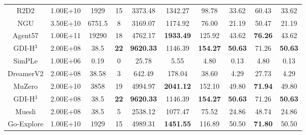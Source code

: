 \documentclass[nohyperref]{article}
\def\GDIHmeanhns{9620.33}
\def\GDIHmedianhns{1146.39}
\def\GDIHHWRB{22}
\def\GDIHmeanHWRNS{154.27}
\def\GDIHmedianHWRNS{50.63}
\def\GDIHmeanSABER{71.26}
\def\GDIHmedianSABER{50.63}
\def\GDIHnumframes{2.00E+08}
\def\GDIHgametime{38.5}
\def\rtdtmeanhns{3373.48}
\def\rtdtmedianhns{1342.27}
\def\rtdtHWRB{15}
\def\rtdtmeanHWRNS{98.78}
\def\rtdtmedianHWRNS{33.62}
\def\rtdtmeanSABER{60.43}
\def\rtdtmedianSABER{33.62}
\def\rtdtnumframes{1.00E+10}
\def\rtdtgametime{1929}
\def\ngumeanhns{3169.07}
\def\ngumedianhns{1174.92}
\def\nguHWRB{8}
\def\ngumeanHWRNS{76.00}
\def\ngumedianHWRNS{21.19}
\def\ngumeanSABER{50.47}
\def\ngumedianSABER{21.19}
\def\ngunumframes{3.50E+10}
\def\ngugametime{6751.5}
\def\agentmeanhns{4762.17}
\def\agentmedianhns{1933.49}
\def\agentHWRB{18}
\def\agentmeanHWRNS{125.92}
\def\agentmedianHWRNS{43.62}
\def\agentmeanSABER{76.26}
\def\agentmedianSABER{43.62}
\def\agentnumframes{1.00E+11}
\def\agentgametime{19290}
\def\muzeromeanhns{4994.97}
\def\muzeromedianhns{2041.12}
\def\muzeroHWRB{19}
\def\muzeromeanHWRNS{152.10}
\def\muzeromedianHWRNS{49.80}
\def\muzeromeanSABER{71.94}
\def\muzeromedianSABER{49.80}
\def\muzeronumframes{2.00E+10}
\def\muzerogametime{3858}
\def\dreamermeanhns{642.49}
\def\dreamermedianhns{178.04}
\def\dreamerHWRB{3}
\def\dreamermeanHWRNS{38.60}
\def\dreamermedianHWRNS{4.29}
\def\dreamermeanSABER{27.73}
\def\dreamermedianSABER{4.29}
\def\dreamernumframes{2.00E+08}
\def\dreamergametime{38.58 }
\def\simplemeanhns{25.78}
\def\simplemedianhns{5.55}
\def\simpleHWRB{0}
\def\simplemeanHWRNS{4.80}
\def\simplemedianHWRNS{0.13}
\def\simplemeanSABER{4.80}
\def\simplemedianSABER{0.13}
\def\simplenumframes{1.00E+06}
\def\simplegametime{0.19}
\def\mueslimeanhns{2538.12}
\def\mueslimedianhns{1077.47}
\def\muesliHWRB{5}
\def\mueslimeanHWRNS{75.52}
\def\mueslimedianHWRNS{24.86}
\def\mueslimeanSABER{48.74}
\def\mueslimedianSABER{24.86}
\def\mueslinumframes{2.00E+08}
\def\muesligametime{38.5}
\def\goexploremeanhns{4989.31}
\def\goexploremedianhns{1451.55}
\def\goexploreHWRB{15}
\def\goexploremeanHWRNS{116.89}
\def\goexploremedianHWRNS{50.50}
\def\goexploremeanSABER{71.80}
\def\goexploremedianSABER{50.50}
\def\goexplorenumframes{1.00E+10}
\def\goexploregametime{1929}
\theoremstyle{plain}
\begin{document}
\begin{table}[H]
\begin{tabular}{ |c | c | c | c| c c | c c |c c|}
R2D2        &\rtdtnumframes   &\rtdtgametime     & \rtdtHWRB & \rtdtmeanhns & \rtdtmedianhns &\rtdtmeanHWRNS  & \rtdtmedianHWRNS& \rtdtmeanSABER & \rtdtmedianSABER \\
NGU         &\ngunumframes & \ngugametime    & \nguHWRB  & \ngumeanhns & \ngumedianhns    &\ngumeanHWRNS  & \ngumedianHWRNS& \ngumeanSABER & \ngumedianSABER\\
Agent57     &\agentnumframes   & \agentgametime      & \agentHWRB & \agentmeanhns & \textbf{\agentmedianhns}    &\agentmeanHWRNS & \agentmedianHWRNS& \textbf{\agentmeanSABER} & \agentmedianSABER\\
\hline
\hline
GDI-H$^3$   &\GDIHnumframes    & \GDIHgametime      & \textbf{\GDIHHWRB} & \textbf{\GDIHmeanhns} & \GDIHmedianhns     &\textbf{\GDIHmeanHWRNS} &\textbf{\GDIHmedianHWRNS} & \GDIHmeanSABER & \textbf{\GDIHmedianSABER}\\
SimPLe      &\simplenumframes   & \simplegametime  & \simpleHWRB  & \simplemeanhns   & \simplemedianhns       &\simplemeanHWRNS   & \simplemedianHWRNS & \simplemeanSABER  & \simplemedianSABER\\
DreamerV2   &\dreamernumframes    & \dreamergametime     & \dreamerHWRB  & \dreamermeanhns  & \dreamermedianhns     &\dreamermeanHWRNS  & \dreamermedianHWRNS & \dreamermeanSABER & \dreamermedianSABER \\
MuZero      & \muzeronumframes   & \muzerogametime     & \muzeroHWRB & \muzeromeanhns & \textbf{\muzeromedianhns}    &\muzeromeanHWRNS & \muzeromedianHWRNS& \textbf{\muzeromeanSABER} & \muzeromedianSABER \\
\hline
\hline
GDI-H$^3$    &\GDIHnumframes    & \GDIHgametime       & \textbf{\GDIHHWRB} & \textbf{\GDIHmeanhns} & \GDIHmedianhns     &\textbf{\GDIHmeanHWRNS} &\textbf{\GDIHmedianHWRNS} & \GDIHmeanSABER & \textbf{\GDIHmedianSABER}\\
Muesli      &\mueslinumframes    & \muesligametime     & \muesliHWRB           &  \mueslimeanhns         & \mueslimedianhns    & \mueslimeanHWRNS          & \mueslimedianHWRNS  & \mueslimeanSABER & \mueslimedianSABER \\
Go-Explore  & \goexplorenumframes   & \goexploregametime     & \goexploreHWRB & \goexploremeanhns & \textbf{\goexploremedianhns}    &\goexploremeanHWRNS & \goexploremedianHWRNS& \textbf{\goexploremeanSABER} & \goexploremedianSABER\\
\hline
\end{tabular}
\end{table}
\end{document}
